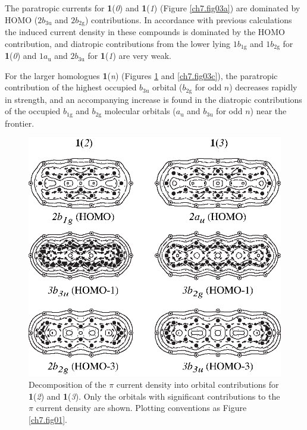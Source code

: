The paratropic currents for \textbf{1}(\textit{0}) and \textbf{1}(\textit{1}) (Figure \ref{ch7.fig03a}) are dominated by HOMO ($2b_\mathrm{3u}$ and $2b_\mathrm{2g}$) contributions. In accordance with previous calculations  \cite{r14,r35,r36} the induced current density in these compounds is dominated by the HOMO contribution, and diatropic contributions from the lower lying $1b_\mathrm{1g}$ and $1b_\mathrm{2g}$ for \textbf{1}(\textit{0}) and $1a_\mathrm{u}$ and $2b_\mathrm{3u}$ for \textbf{1}(\textit{1}) are very weak.

For the larger homologues \textbf{1}(\textit{n}) (Figures \ref{ch7.fig03b} and \ref{ch7.fig03c}), the paratropic contribution of the highest occupied $b_\mathrm{3u}$ orbital ($b_\mathrm{2g}$ for odd $n$) decreases rapidly in strength, and an accompanying increase is found in the diatropic contributions of the occupied $b_\mathrm{1g}$ and $b_\mathrm{2g}$ molecular orbitals ($a_\mathrm{u}$ and $b_\mathrm{3u}$ for odd $n$) near the frontier.
\begin{figure}[htp]
\center
\includegraphics{indacene/figures/figure3b.eps}
\caption{Decomposition of the $\pi$ current density into orbital contributions for \textbf{1}(\textit{2}) and \textbf{1}(\textit{3}). Only the orbitals with significant contributions to the $\pi$ current density are shown. Plotting conventions as Figure \ref{ch7.fig01}.}
\label{ch7.fig03b}
\end{figure}
